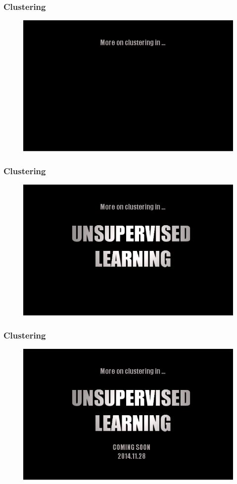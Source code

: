 \documentclass[table]{beamer}
\begin{document}
\frame
{
	\frametitle{Clustering}
	\begin{figure}
		\includegraphics[scale=0.45]{fig/ulcs1.png}		
	\end{figure}
}
\frame
{
	\frametitle{Clustering}
	\begin{figure}
		\includegraphics[scale=0.45]{fig/ulcs2.png}	
	\end{figure}
}
\frame
{
	\frametitle{Clustering}
	\begin{figure}
		\includegraphics[scale=0.45]{fig/ulcs3.png}	
	\end{figure}
}
\end{document}
